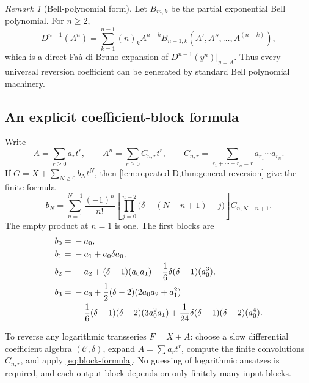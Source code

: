 \documentclass[11pt,oneside]{article}
\theoremstyle{plain}
\theoremstyle{definition}
\theoremstyle{remark}
\newtheorem{remark}[theorem]{Remark}
\newcommand{\Ccal}{\mathcal{C}}
\begin{document}
\begin{remark}[Bell-polynomial form]
Let \(B_{m,k}\) be the partial exponential Bell polynomial.  For \(n\ge2\),
\begin{equation}
 D^{n-1}(A^n)
 =\sum_{k=1}^{n-1}(n)_{\underline{k}}A^{n-k}
 B_{n-1,k}(A',A'',\ldots,A^{(n-k)}),
 \label{eq:Bell-form}
\end{equation}
which is a direct Fa\`a di Bruno expansion of \(D^{n-1}(y^n)|_{y=A}\).
Thus every universal reversion coefficient can be generated by standard Bell
polynomial machinery.
\end{remark}

\subsection{An explicit coefficient-block formula}

Write
\begin{equation}
 A=\sum_{r\ge0}a_r t^r,
 \qquad
 A^n=\sum_{r\ge0}C_{n,r}t^r,
 \qquad
 C_{n,r}=\sum_{r_1+\cdots+r_n=r}a_{r_1}\cdots a_{r_n}.
 \label{eq:Cnr-def}
\end{equation}
If \(G=X+\sum_{N\ge0}b_Nt^N\), then \cref{lem:repeated-D,thm:general-reversion}
give the finite formula
\begin{equation}
 \boxed{
 b_N=\sum_{n=1}^{N+1}\frac{(-1)^n}{n!}
 \left[\prod_{j=0}^{n-2}
 \bigl(\delta-(N-n+1)-j\bigr)\right]
 C_{n,N-n+1}.}
 \label{eq:block-formula}
\end{equation}
The empty product at \(n=1\) is one.  The first blocks are
\begin{align}
 b_0={}&-a_0,\label{eq:b0}\\
 b_1={}&-a_1+a_0\delta a_0,\label{eq:b1}\\
 b_2={}&-a_2+(\delta-1)(a_0a_1)
 -\frac16\delta(\delta-1)(a_0^3),\label{eq:b2}\\
 b_3={}&-a_3+\frac12(\delta-2)(2a_0a_2+a_1^2)\notag\\
 &-\frac16(\delta-1)(\delta-2)(3a_0^2a_1)
 +\frac1{24}\delta(\delta-1)(\delta-2)(a_0^4).
 \label{eq:b3}
\end{align}

\begin{methodbox}
To reverse any logarithmic transseries \(F=X+A\):
choose a slow differential coefficient algebra \((\Ccal,\delta)\), expand
\(A=\sum a_rt^r\), compute the finite convolutions \(C_{n,r}\), and apply
\eqref{eq:block-formula}.  No guessing of logarithmic ansatzes is required, and
each output block depends on only finitely many input blocks.
\end{methodbox}
\end{document}
